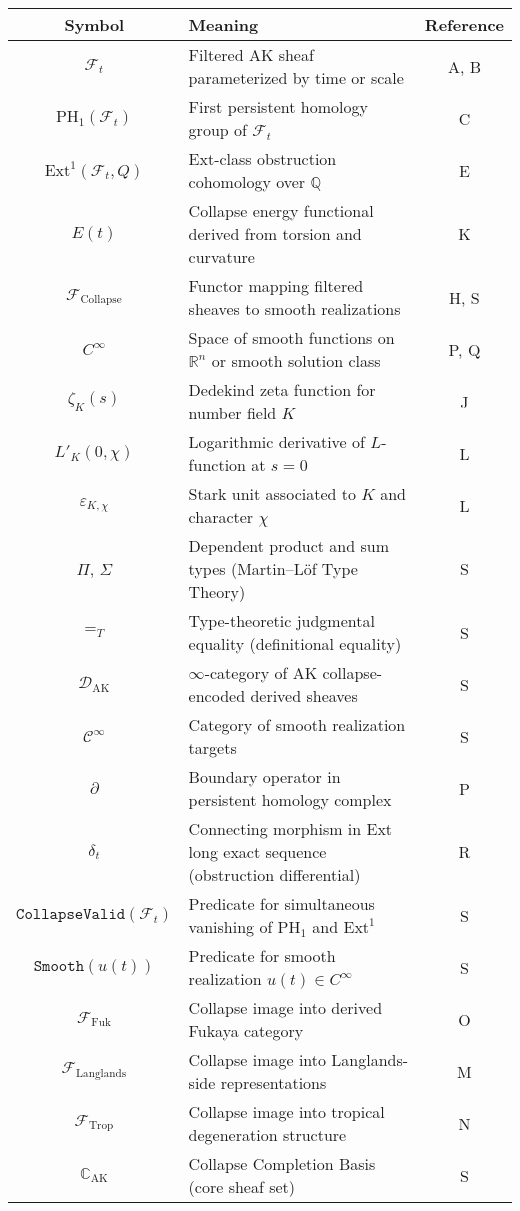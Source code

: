 \documentclass[11pt]{article}
\begin{document}
{\begin{center}
\begin{tabular}{|c|p{8cm}|c|}
\hline
\textbf{Symbol} & \textbf{Meaning} & \textbf{Reference} \\
\hline
$\mathcal{F}_t$ & Filtered AK sheaf parameterized by time or scale & A, B \\
$\mathrm{PH}_1(\mathcal{F}_t)$ & First persistent homology group of $\mathcal{F}_t$ & C \\
$\mathrm{Ext}^1(\mathcal{F}_t, Q)$ & Ext-class obstruction cohomology over $\mathbb{Q}$ & E \\
$E(t)$ & Collapse energy functional derived from torsion and curvature & K \\
$\mathcal{F}_{\mathrm{Collapse}}$ & Functor mapping filtered sheaves to smooth realizations & H, S \\
$C^\infty$ & Space of smooth functions on $\mathbb{R}^n$ or smooth solution class & P, Q \\
$\zeta_K(s)$ & Dedekind zeta function for number field $K$ & J \\
$L'_K(0,\chi)$ & Logarithmic derivative of $L$-function at $s=0$ & L \\
$\varepsilon_{K,\chi}$ & Stark unit associated to $K$ and character $\chi$ & L \\
$\Pi$, $\Sigma$ & Dependent product and sum types (Martin–Löf Type Theory) & S \\
$=_T$ & Type-theoretic judgmental equality (definitional equality) & S \\
$\mathcal{D}_{\mathrm{AK}}$ & $\infty$-category of AK collapse-encoded derived sheaves & S \\
$\mathcal{C}^\infty$ & Category of smooth realization targets & S \\
$\partial$ & Boundary operator in persistent homology complex & P \\
$\delta_t$ & Connecting morphism in Ext long exact sequence (obstruction differential) & R \\
$\texttt{CollapseValid}(\mathcal{F}_t)$ & Predicate for simultaneous vanishing of $\mathrm{PH}_1$ and $\mathrm{Ext}^1$ & S \\
$\texttt{Smooth}(u(t))$ & Predicate for smooth realization $u(t) \in C^\infty$ & S \\
$\mathcal{F}_{\mathrm{Fuk}}$ & Collapse image into derived Fukaya category & O \\
$\mathcal{F}_{\mathrm{Langlands}}$ & Collapse image into Langlands-side representations & M \\
$\mathcal{F}_{\mathrm{Trop}}$ & Collapse image into tropical degeneration structure & N \\
$\mathbb{C}_{\mathrm{AK}}$ & Collapse Completion Basis (core sheaf set) & S \\
\hline
\end{tabular}
\end{center}

}
\end{document}
